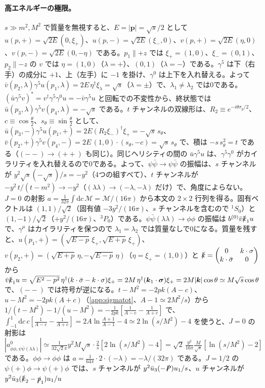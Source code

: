 \documentclass[a4paper,10pt]{ltjsarticle}
\newcommand{\dd}{\mathrm{d}}
\begin{document}
\paragraph{高エネルギーの極限。}$s\gg m^2,M^2$ で質量を無視すると、$E=|\boldsymbol p|=\sqrt s/2$ として $u(p,+)=\sqrt{2E}(0,\xi_+)$、$u(p,-)=\sqrt{2E}(\xi_-,0)$、$v(p,+)=\sqrt{2E}(\eta,0)$、$v(p,-)=\sqrt{2E}(0,-\eta)$ である。$p_1\parallel+z$ では $\xi_+=(1,0)$、$\xi_-=(0,1)$、$p_2\parallel-z$ の $v$ では $\eta=(1,0)$（$\lambda=+$）、$(0,1)$（$\lambda=-$）である。$\gamma^5$ は下（右手）の成分に $+1$、上（左手）に $-1$ を掛け、$\gamma^0$ は上下を入れ替える。よって $\bar v(p_2,\lambda)\gamma^5u(p_1,\lambda)=2E\,\eta^\dagger\xi_\lambda=\sqrt s$（$\lambda=\pm$）で、$\lambda_1\ne\lambda_2$ では0である。$(\bar u\gamma^5v)^*=v^\dagger\gamma^5\gamma^0u=-\bar v\gamma^5u$ と回転での不変性から、終状態では $\bar u(p_3,\lambda)\gamma^5v(p_4,\lambda)=-\sqrt s$ である。$t$ チャンネルの双線形は、$R_2\equiv e^{-i\theta\sigma_y/2}$、$c\equiv\cos\frac\theta2$、$s_\theta\equiv\sin\frac\theta2$ として、$\bar u(p_3,-)\gamma^5u(p_1,+)=2E(R_2\xi_-)^\dagger\xi_+=-\sqrt s\,s_\theta$、$\bar v(p_2,+)\gamma^5v(p_4,-)=2E\,(1,0)\cdot(s_\theta,-c)=\sqrt s\,s_\theta$ で、積は $-s\,s_\theta^2=t$ である（$(--)\to(++)$ も同じ）。同じヘリシティの間の $\bar u\gamma^5u$ は、$\gamma^5\gamma^0$ がカイラリティを入れ替えるので0である。よって、$\psi\bar\psi\to\psi\bar\psi$ の振幅は、$s$ チャンネルが $y^2\sqrt s(-\sqrt s)/s=-y^2$（4つの組すべて）、$t$ チャンネルが $-y^2\,t/(t-m^2)\to-y^2$（$(\lambda\lambda)\to(-\lambda,-\lambda)$ だけ）で、角度によらない。$J=0$ の射影 $a=\frac{1}{32\pi}\int\dd c\,\mathcal M=\mathcal M/(16\pi)$ から本文の $2\times2$ 行列を得る。固有ベクトルは $(1,1)/\sqrt2$（固有値 $-3y^2/(16\pi)$、$s$ チャンネルを含むので ${}^1S_0$）と $(1,-1)/\sqrt2$（$+y^2/(16\pi)$、${}^3P_0$）である。$\psi\bar\psi(\lambda\lambda)\to\phi\phi$ の振幅は $b^{(0)}\bar v\slashed k_1u$ で、$\gamma^\mu$ はカイラリティを保つので $\lambda_1=\lambda_2$ では質量なしで0になる。質量を残すと、$u(p_1,+)=(\sqrt{E-p}\,\xi_+,\sqrt{E+p}\,\xi_+)$、$v(p_2,+)=(\sqrt{E+p}\,\eta,-\sqrt{E-p}\,\eta)$（$\eta=\xi_+=(1,0)$）と $\slashed k=\begin{pmatrix}0&k\cdot\sigma\\k\cdot\bar\sigma&0\end{pmatrix}$ から $\bar v\slashed k_1u=\sqrt{E^2-p^2}\,\eta^\dagger(k\cdot\bar\sigma-k\cdot\sigma)\xi_+=2M\,\eta^\dagger(\boldsymbol k_1\cdot\boldsymbol\sigma)\xi_+=2M|\boldsymbol k|\cos\theta\simeq M\sqrt s\cos\theta$ で、$(--)$ では符号が逆になる。$t-M^2=-2pk(A-c)$、$u-M^2=-2pk(A+c)$（\ref{app:sigmatot}、$A-1\simeq2M^2/s$）から $1/(t-M^2)-1/(u-M^2)=-\frac{1}{2pk}[\frac{1}{A-c}-\frac{1}{A+c}]$ で、$\int_{-1}^1\dd c\,c[\frac{1}{A-c}-\frac{1}{A+c}]=2A\ln\frac{A+1}{A-1}-4\simeq2\ln(s/M^2)-4$ を使うと、$J=0$ の射影は $|a^0_{\phi\phi,\psi\bar\psi(\lambda\lambda)}|\simeq\frac{1}{32\sqrt2\pi}y^2M\sqrt s\cdot\frac{2}{s}[2\ln(s/M^2)-4]=\sqrt2\,\frac{y^2}{16\pi}\frac{M}{\sqrt s}[\ln(s/M^2)-2]$ である。$\phi\phi\to\phi\phi$ は $a=\frac{1}{64\pi}\cdot2\cdot(-\lambda)=-\lambda/(32\pi)$ である。$J=1/2$ の $\psi(+)\phi\to\psi(+)\phi$ では、$s$ チャンネルが $y^2\bar u_3(-\slashed P)u_1/s$、$u$ チャンネルが $y^2\bar u_3(\slashed k_2-\slashed p_1)u_1/u$ 
\end{document}
